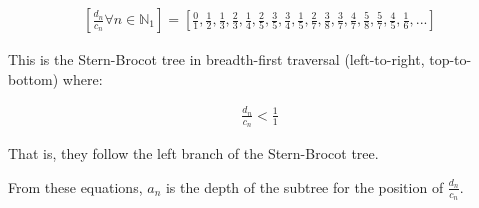 \documentclass{article}
\begin{document}
\begin{displaymath}\begin{aligned}
\left[
\frac{d_n}{c_n} \forall n \in \mathbb{N}_1
\right]
=
\left[
\frac{0}{1},
\frac{1}{2},
\frac{1}{3},
\frac{2}{3},
\frac{1}{4},
\frac{2}{5},
\frac{3}{5},
\frac{3}{4},
\frac{1}{5},
\frac{2}{7},
\frac{3}{8},
\frac{3}{7},
\frac{4}{7},
\frac{5}{8},
\frac{5}{7},
\frac{4}{5},
\frac{1}{6},
...
\right]
\end{aligned}\end{displaymath}

\noindent
This is the Stern-Brocot tree in breadth-first traversal (left-to-right,
top-to-bottom) where:

\begin{displaymath}\begin{aligned}
\frac{d_n}{c_n} < \frac{1}{1}
\end{aligned}\end{displaymath}

\noindent
That is, they follow the left branch of the Stern-Brocot tree.

\noindent
From these equations, \begin{math}a_n\end{math} is the depth of the subtree
for the position of \begin{math}\frac{d_n}{c_n}\end{math}.
\end{document}
